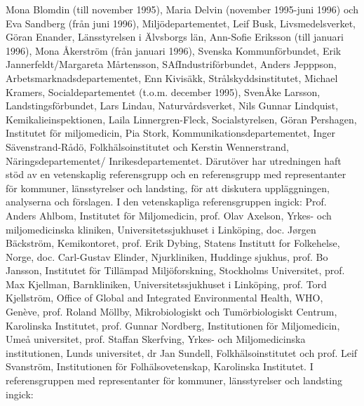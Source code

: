 Mona Blomdin (till november 1995), Maria Delvin (november 1995-juni 1996) och Eva Sandberg (från juni 1996), Miljödepartementet, Leif Busk, Livsmedelsverket, Göran Enander, Länsstyrelsen i Älvsborgs län, Ann-Sofie Eriksson (till januari 1996), Mona Åkerström (från januari 1996), Svenska Kommunförbundet, Erik Jannerfeldt/Margareta Mårtensson, SAfIndustriförbundet, Anders Jepppson, Arbetsmarknadsdepartementet, Enn Kivisäkk, Strålskyddsinstitutet, Michael Kramers, Socialdepartementet (t.o.m. december 1995), SvenÅke Larsson, Landstingsförbundet, Lars Lindau, Naturvårdsverket, Nils Gunnar Lindquist, Kemikalieinspektionen, Laila Linnergren-Fleck, Socialstyrelsen, Göran Pershagen, Institutet för miljomedicin, Pia Stork, Kommunikationsdepartementet, Inger Sävenstrand-Rådö, Folkhälsoinstitutet och Kerstin Wennerstrand, Näringsdepartementet/ Inrikesdepartementet.
Därutöver har utredningen haft stöd av en vetenskaplig referensgrupp och en referensgrupp med representanter för kommuner, länsstyrelser och landsting, för att diskutera uppläggningen, analyserna och förslagen. I den vetenskapliga referensgruppen ingick:
Prof. Anders Ahlbom, Institutet för Miljomedicin, prof. Olav Axelson, Yrkes- och miljomedicinska kliniken, Universitetssjukhuset i Linköping, doc. Jørgen Bäckström, Kemikontoret, prof. Erik Dybing, Statens Institutt for Folkehelse, Norge, doc. Carl-Gustav Elinder, Njurkliniken, Huddinge sjukhus, prof. Bo Jansson, Institutet för Tillämpad Miljöforskning, Stockholms Universitet, prof. Max Kjellman, Barnkliniken, Universitetssjukhuset i Linköping, prof. Tord Kjellström, Office of Global and Integrated Environmental Health, WHO, Genève, prof. Roland Möllby, Mikrobiologiskt och Tumörbiologiskt Centrum, Karolinska Institutet, prof. Gunnar Nordberg, Institutionen för Miljomedicin, Umeå universitet, prof. Staffan Skerfving, Yrkes- och Miljomedicinska institutionen, Lunds universitet, dr Jan Sundell, Folkhälsoinstitutet och prof. Leif Svanström, Institutionen för Folhälsovetenskap, Karolinska Institutet.
I referensgruppen med representanter för kommuner, länsstyrelser och landsting ingick:

